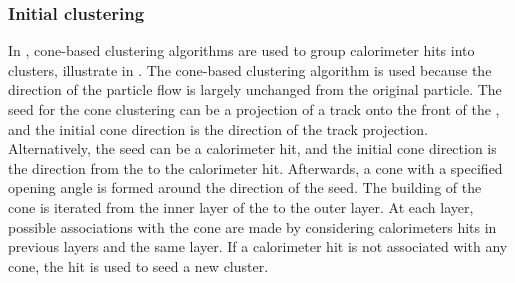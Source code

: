\subsubsection{Initial clustering}
\label{sec:pandoraConeCluster}











In \pandora, cone-based clustering algorithms are used to group calorimeter hits into clusters, illustrate in  . The cone-based clustering algorithm is used because the direction of the particle flow is largely unchanged from the original particle. The seed for the cone clustering can be a projection of a track onto the front of the \ECAL, and the initial cone direction is the direction of the track projection. Alternatively, the seed can be a calorimeter hit, and the initial cone direction is the direction from the \IP to the calorimeter hit. Afterwards, a cone with a specified opening angle is formed around the direction of the seed. The building of the cone is iterated from the inner layer of the \ECAL to the outer layer. At each layer, possible associations  with the cone are made by considering calorimeters hits in previous layers and the same layer. If a calorimeter hit is not associated with any cone, the hit is used to seed a new cluster.

